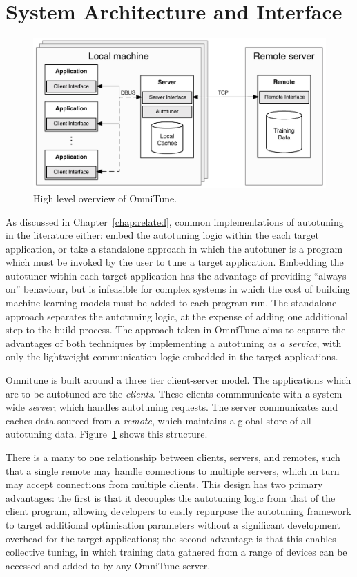 \section{System Architecture and Interface}

\begin{figure}
\centering
\includegraphics[width=.9\textwidth]{img/omnitune-system-overview.pdf}
\caption[OmniTune system diagram]{%
  High level overview of OmniTune.%
}
\label{fig:omnitune-system-overview}
\end{figure}

As discussed in Chapter~\ref{chap:related}, common implementations of
autotuning in the literature either: embed the autotuning logic within
the each target application, or take a standalone approach in which
the autotuner is a program which must be invoked by the user to tune a
target application. Embedding the autotuner within each target
application has the advantage of providing ``always-on'' behaviour,
but is infeasible for complex systems in which the cost of building
machine learning models must be added to each program run. The
standalone approach separates the autotuning logic, at the expense of
adding one additional step to the build process. The approach taken in
OmniTune aims to capture the advantages of both techniques by
implementing a autotuning \emph{as a service}, with only the
lightweight communication logic embedded in the target applications.

Omnitune is built around a three tier client-server model. The
applications which are to be autotuned are the \emph{clients}. These
clients commmunicate with a system-wide \emph{server}, which handles
autotuning requests. The server communicates and caches data sourced
from a \emph{remote}, which maintains a global store of all autotuning
data. Figure~\ref{fig:omnitune-system-overview} shows this structure.

There is a many to one relationship between clients, servers, and
remotes, such that a single remote may handle connections to multiple
servers, which in turn may accept connections from multiple
clients. This design has two primary advantages: the first is that it
decouples the autotuning logic from that of the client program,
allowing developers to easily repurpose the autotuning framework to
target additional optimisation parameters without a significant
development overhead for the target applications; the second advantage
is that this enables collective tuning, in which training data
gathered from a range of devices can be accessed and added to by any
OmniTune server.

